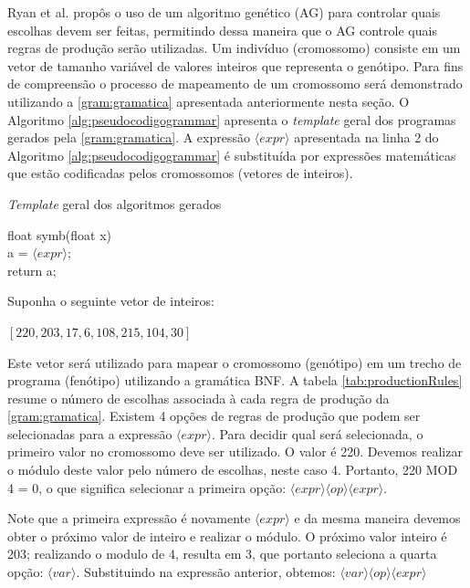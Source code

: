 Ryan et al. \cite{ryan1998grammatical}  propôs o uso de um algoritmo genético (AG) para controlar quais escolhas devem ser feitas, permitindo dessa maneira que o AG controle quais regras de produção serão utilizadas. Um indivíduo (cromossomo) consiste em um vetor de tamanho variável de valores inteiros que representa o genótipo. Para fins de compreensão o processo de mapeamento de um cromossomo será demonstrado utilizando a \autoref{gram:gramatica} apresentada anteriormente nesta seção. O Algoritmo \ref{alg:pseudocodigogrammar} apresenta o \textit{template} geral dos programas gerados pela \autoref{gram:gramatica}. A expressão $\langle expr \rangle$ apresentada na linha 2 do Algoritmo \ref{alg:pseudocodigogrammar} é substituída por expressões matemáticas que estão codificadas pelos cromossomos (vetores de inteiros). 

\begin{algorithm}
	\caption{\textit{Template} geral dos algoritmos gerados}
	\label{alg:pseudocodigogrammar}
	float symb(float x) { \\
		a = $\langle expr \rangle$;   \\
		return a;  \\
	}	
\end{algorithm}

\noindent
Suponha o seguinte vetor de inteiros:

\begin{center}
	$ [220, 203, 17, 6, 108, 215, 104, 30] $
\end{center}


Este vetor será utilizado para mapear o cromossomo (genótipo) em um trecho de programa (fenótipo) utilizando a gramática BNF. 
A tabela \autoref{tab:productionRules} resume o número de escolhas associada à cada regra de produção da \autoref{gram:gramatica}. Existem 4 opções de regras de produção que podem ser selecionadas para a expressão $ \langle expr \rangle$. Para decidir qual será selecionada, o primeiro valor no cromossomo deve ser utilizado. O valor é 220. Devemos realizar o módulo deste valor pelo número de escolhas, neste caso 4. Portanto, 220 MOD 4 = 0, o que significa selecionar a primeira opção: $\langle expr \rangle \langle op \rangle \langle expr \rangle$.

Note que a primeira expressão é novamente $ \langle expr \rangle$ e da mesma maneira devemos obter o próximo valor de inteiro e realizar o módulo. O próximo valor inteiro é 203; realizando o modulo de 4, resulta em 3, que portanto seleciona a quarta opção: $ \langle var \rangle$. Substituindo na expressão anterior, obtemos: $ \langle var \rangle \langle op \rangle \langle expr \rangle$

